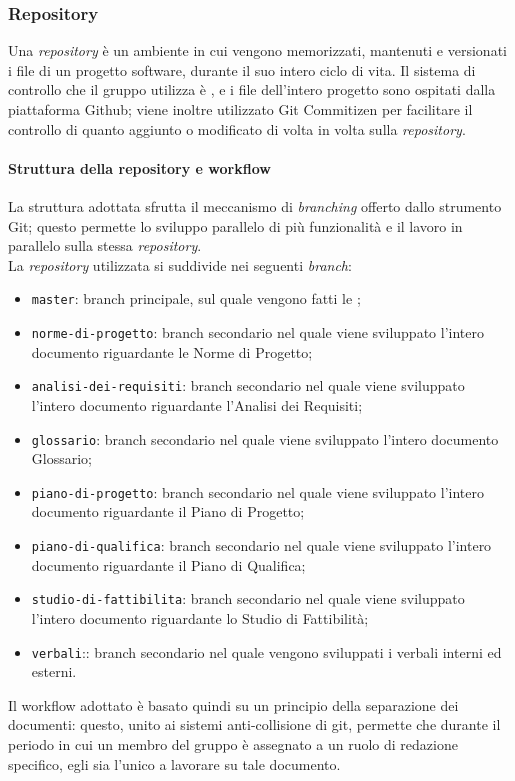 \documentclass[../norme-di-progetto.tex]{subfiles}
\begin{document}
\subsubsection{Repository}
Una \textit{repository} è un ambiente in cui vengono memorizzati, mantenuti e versionati i file di un progetto software, durante il suo intero ciclo di vita. Il sistema di controllo che il gruppo utilizza è , e i file dell'intero progetto sono ospitati dalla piattaforma Github; viene inoltre utilizzato Git Commitizen per facilitare il controllo di quanto aggiunto o modificato di volta in volta sulla \textit{repository}.

\paragraph{Struttura della repository e workflow}
La struttura adottata sfrutta il meccanismo di \textit{branching} offerto dallo strumento Git; questo permette lo sviluppo parallelo di più funzionalità e il lavoro in parallelo sulla stessa \textit{repository}. \\
La \textit{repository} utilizzata si suddivide nei seguenti \textit{branch}:
\begin{itemize}
  \item \texttt{master}: branch principale, sul quale vengono fatti le ;
  \item \texttt{norme-di-progetto}: branch secondario nel quale viene sviluppato l'intero documento riguardante le Norme di Progetto;
  \item \texttt{analisi-dei-requisiti}: branch secondario nel quale viene sviluppato l'intero documento riguardante l'Analisi dei Requisiti;
  \item \texttt{glossario}: branch secondario nel quale viene sviluppato l'intero documento Glossario;
  \item \texttt{piano-di-progetto}: branch secondario nel quale viene sviluppato l'intero documento riguardante il Piano di Progetto;
  \item \texttt{piano-di-qualifica}: branch secondario nel quale viene sviluppato l'intero documento riguardante il Piano di Qualifica;
  \item \texttt{studio-di-fattibilita}: branch secondario nel quale viene sviluppato l'intero documento riguardante lo Studio di Fattibilità;
  \item \texttt{verbali}:: branch secondario nel quale vengono sviluppati i verbali interni ed esterni.
\end{itemize}
Il workflow adottato è basato quindi su un principio della separazione dei documenti: questo, unito ai sistemi anti-collisione di git, permette che durante il periodo in cui un membro del gruppo è assegnato a un ruolo di redazione specifico, egli sia l'unico a lavorare su tale documento.
\end{document}
